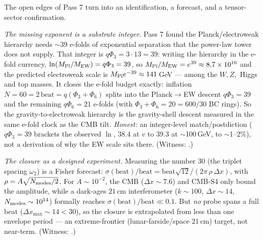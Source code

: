 \documentclass[11pt]{article}
\begin{document}
The open edges of Pass 7 turn into an identification, a forecast, and a tensor-sector
confirmation.

\emph{The missing exponent is a substrate integer.} Pass 7 found the Planck/electroweak
hierarchy needs $\sim$39 e-folds of exponential separation that the power-law tower does
not supply. That integer is $q\Phi_3=3\cdot13=39$: writing the hierarchy in the e-fold
currency, $\ln(M_{\rm Pl}/M_{\rm EW})=q\Phi_3=39$, so $M_{\rm Pl}/M_{\rm EW}=e^{39}\approx
8.7\times10^{16}$ and the predicted electroweak scale is $M_{\rm Pl}e^{-39}\approx141$\,GeV
--- among the $W,Z,$ Higgs and top masses. It closes the e-fold budget exactly: inflation
$N=60=2\,\mathrm{beat}=q(\Phi_3+\Phi_6)$ splits into the Planck$\to$EW descent
$q\Phi_3=39$ and the remaining $q\Phi_6=21$ e-folds (with $\Phi_3+\Phi_6=20=600/30$ BC
rings). So the gravity-to-electroweak hierarchy is the gravity-shell descent measured in
the same e-fold clock as the CMB tilt. \emph{Honest:} an integer-level match/postdiction
($q\Phi_3=39$ brackets the observed $\ln$, $38.4$ at $v$ to $39.3$ at $\sim$100\,GeV, to
$\sim$1--2\%), not a derivation of why the EW scale sits there. (Witness:
.)

\emph{The closure as a designed experiment.} Measuring the number $30$ (the triplet
spacing $\omega_2$) is a Fisher forecast: $\sigma(\mathrm{beat})/\mathrm{beat}=
\mathrm{beat}\sqrt{12}/(2\pi\,\rho\,\Delta x)$, with $\rho=A\sqrt{N_{\rm modes}/2}$. For
$A\sim10^{-2}$, the CMB ($\Delta x\sim7.6$) and CMB-S4 only bound the amplitude, while a
dark-ages $21$\,cm interferometer ($k\sim100$, $\Delta x\sim14$, $N_{\rm modes}\sim10^{14}$)
formally reaches $\sigma(\mathrm{beat})/\mathrm{beat}\ll0.1$. But \emph{no} probe spans a
full beat ($\Delta x_{\max}\sim14<30$), so the closure is extrapolated from less than one
envelope period --- an extreme-frontier (lunar-farside/space $21$\,cm) target, not
near-term. (Witness: .)
\end{document}
